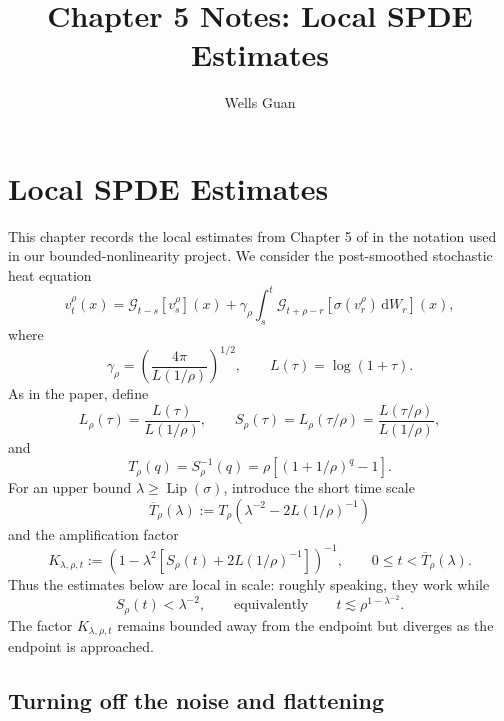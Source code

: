\documentclass[11pt]{article}
\title{Chapter 5 Notes: Local SPDE Estimates}
\author{Wells Guan}
\date{}
\theoremstyle{definition}
\theoremstyle{remark}
\newcommand{\Lip}{\operatorname{Lip}}
\newcommand{\dd}{\,\mathrm{d}}
\newcommand{\hsemig}[2]{\mathcal{G}_{#1}\left[{#2}\right]}
\newcommand{\Trho}{T_{\rho}}
\newcommand{\Srho}{S_{\rho}}
\newcommand{\Lrho}{L_{\rho}}
\begin{document}
\maketitle

\section{Local SPDE Estimates}

This chapter records the local estimates from Chapter 5 of
\cite{dunlap2026renormalizationflow2dnonlinear} in the notation used in our bounded-nonlinearity project.
We consider the post-smoothed stochastic heat equation
\begin{equation}\label{eq:ch5-spde}
 v_t^{\rho}(x)
 = \hsemig{t-s}{v_s^{\rho}}(x)
 + \gamma_{\rho}\int_s^t
 \hsemig{t+\rho-r}{\sigma(v_r^{\rho})\dd W_r}(x),
\end{equation}
where
\[
\gamma_{\rho}=\left(\frac{4\pi}{L(1/\rho)}\right)^{1/2},
\qquad
L(\tau)=\log(1+\tau).
\]
As in the paper, define
\begin{equation}\label{eq:ch5-scales}
\Lrho(\tau)=\frac{L(\tau)}{L(1/\rho)},
\qquad
\Srho(\tau)=\Lrho(\tau/\rho)
=\frac{L(\tau/\rho)}{L(1/\rho)},
\end{equation}
and
\begin{equation}\label{eq:ch5-Trho}
\Trho(q)=\Srho^{-1}(q)
=\rho\left[(1+1/\rho)^q-1\right].
\end{equation}
For an upper bound \(\lambda\ge \Lip(\sigma)\), introduce the short time scale
\begin{equation}\label{eq:ch5-Tbar}
\overline T_{\rho}(\lambda)
:=\Trho\!\left(\lambda^{-2}-2L(1/\rho)^{-1}\right)
\end{equation}
and the amplification factor
\begin{equation}\label{eq:ch5-K}
K_{\lambda,\rho,t}
:=\left(1-\lambda^2\left[\Srho(t)+2L(1/\rho)^{-1}\right]\right)^{-1},
\qquad 0\le t<\overline T_{\rho}(\lambda).
\end{equation}
Thus the estimates below are local in scale: roughly speaking, they work while
\[
\Srho(t)<\lambda^{-2},
\qquad\text{equivalently}\qquad
 t\lesssim \rho^{1-\lambda^{-2}}.
\]
The factor \(K_{\lambda,\rho,t}\) remains bounded away from the endpoint but diverges as the endpoint is approached.

\subsection{Turning off the noise and flattening}
\end{document}
